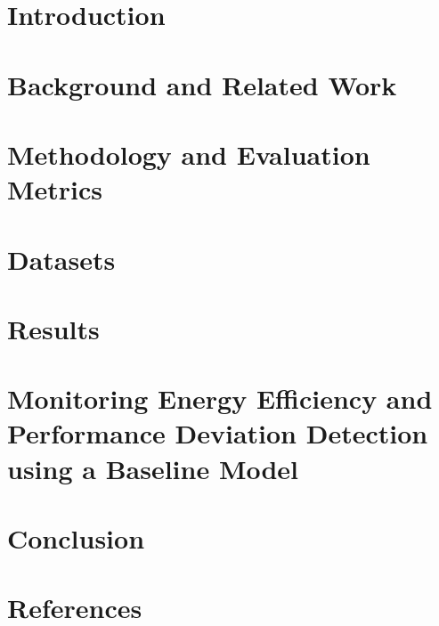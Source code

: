 \documentclass[12pt, letterpaper]{article}
\begin{document}


\tableofcontents
\pagebreak
\listoffigures
\listoftables

\pagebreak

\section{Introduction}

\pagebreak

\section{Background and Related Work}

\pagebreak

\section{Methodology and Evaluation Metrics}

\pagebreak

\section{Datasets}

\pagebreak

\section{Results}

\pagebreak

\section{Monitoring Energy Efficiency and Performance Deviation Detection using a Baseline Model}

\pagebreak

\section{Conclusion}

\pagebreak


\section{References}
\printbibliography[heading=none]
\pagebreak


%
\end{document}
